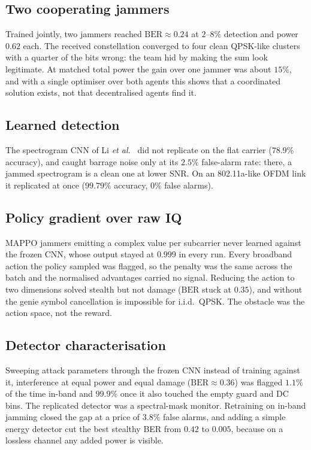 \documentclass[conference]{IEEEtran}
\begin{document}
\subsection{Two cooperating jammers}
Trained jointly, two jammers reached $\mathrm{BER} \approx 0.24$ at $2$--$8\%$ detection and power
$0.62$ each.
The received constellation converged to four clean QPSK-like clusters with a quarter of the bits wrong: the team hid by making the sum look legitimate.
At matched total power the gain over one jammer was about $15\%$, and with a single optimiser over both agents this shows that a coordinated solution exists, not that decentralised agents find it.

\subsection{Learned detection}
The spectrogram CNN of Li \emph{et al.}~ did not replicate on the flat carrier ($78.9\%$ accuracy), and caught barrage noise only at its $2.5\%$ false-alarm rate: there, a jammed spectrogram is a clean one at lower SNR.
On an 802.11a-like OFDM link it replicated at once ($99.79\%$ accuracy, $0\%$ false alarms).

\subsection{Policy gradient over raw IQ}
MAPPO jammers emitting a complex value per subcarrier never learned against the frozen CNN, whose output stayed at $0.999$ in every run.
Every broadband action the policy sampled was flagged, so the penalty was the same across the batch and the normalised advantages carried no signal.
Reducing the action to two dimensions solved stealth but not damage ($\mathrm{BER}$ stuck at $0.35$), and without the genie symbol cancellation is impossible for i.i.d.\ QPSK.
The obstacle was the action space, not the reward.

\subsection{Detector characterisation}
Sweeping attack parameters through the frozen CNN instead of training against it, interference at equal power and equal damage ($\mathrm{BER} \approx 0.36$) was flagged $1.1\%$ of the time in-band and $99.9\%$ once it also touched the empty guard and DC bins.
The replicated detector was a spectral-mask monitor.
Retraining on in-band jamming closed the gap at a price of $3.8\%$ false alarms, and adding a simple energy detector cut the best stealthy BER from $0.42$ to $0.005$, because on a lossless channel any added power is visible.
\end{document}
